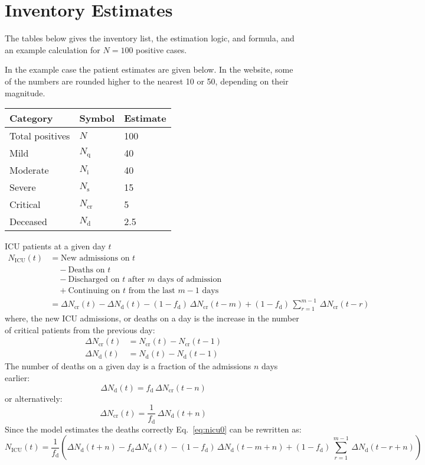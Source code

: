 \documentclass{article}
\newcommand{\nd}{\ensuremath{N_{\mathrm{d}}}}
\newcommand{\ncr}{\ensuremath{N_{\mathrm{cr}}}}
\newcommand{\ns}{\ensuremath{N_{\mathrm{s}}}}
\newcommand{\nin}{\ensuremath{N_{\mathrm{i}}}}
\newcommand{\nq}{\ensuremath{N_{\mathrm{q}}}}
\newcommand{\fd}{\ensuremath{f_{\mathrm{d}}}}
\newcommand{\nicu}{\ensuremath{N_{\mathrm{ICU}}}}
\begin{document}
\section{Inventory Estimates}
The tables below gives the inventory list, the estimation logic, and
formula, and an example calculation for $N=100$ positive cases.

In the example case the patient estimates are given below. In the
website, some of the numbers are rounded higher to the nearest 10 or
50, depending on their magnitude.

\noindent
\begin{tabular}{lll}
  \toprule
  Category & Symbol & Estimate \\
  \midrule
  Total positives & $N$ & 100 \\
  Mild & $\nq$ & 40 \\
  Moderate & $\nin$ & 40 \\
  Severe & $\ns$ & 15 \\
  Critical & $\ncr$ & 5\\
  Deceased & $\nd$ & 2.5\\
  \bottomrule
\end{tabular}

ICU patients at a given day $t$
\begin{equation}
  \label{eq:nicu0}
  \begin{split}
  \nicu(t)
  &= \text{New admissions on $t$}\\
  & \quad - \text{Deaths on $t$}\\
  & \quad - \text{Discharged on $t$ after $m$ days of admission}\\
  & \quad + \text{Continuing on $t$ from the last $m-1$ days} \\
   &= \Delta \ncr (t)
    - \Delta \nd(t) 
    - (1-\fd) \, \Delta \ncr(t-m)
    + (1-\fd) \, \sum_{r=1}^{m-1} \, \Delta \ncr(t-r)
  \end{split}
\end{equation}
where, the new ICU admissions, or deaths on a day is the increase in
the number of critical patients from the previous day:
\begin{align}
  \Delta \ncr(t)  &= \ncr(t) - \ncr(t-1) \\
  \Delta \nd(t)  &= \nd(t) - \nd(t-1)
\end{align}
The number of deaths on a given day is a fraction of the admissions
$n$ days earlier:
\begin{equation}
  \Delta \nd(t) = \fd \, \Delta \ncr(t-n)
\end{equation}
or alternatively:
\begin{equation}
  \Delta \ncr(t) = \frac{1}{\fd} \, \Delta \nd(t+n)
\end{equation}
Since the model estimates the deaths correctly Eq.~\eqref{eq:nicu0} can be
rewritten as:
\begin{equation}
  \label{eq:nicu}
  \nicu(t)
  = \frac{1}{\fd} \left( \Delta \nd (t+n)
                       - \fd \Delta \nd(t) 
                       - (1-\fd) \, \Delta \nd(t-m+n)
                       + (1-\fd) \, \sum_{r=1}^{m-1} \, \Delta \nd(t-r+n)
                       \right)
\end{equation}
\end{document}
